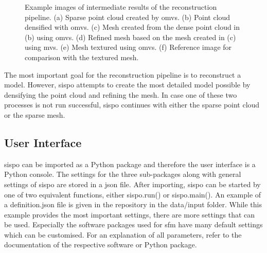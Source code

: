 \begin{figure}[htb]
\begin{subfigure}[b]{0.4\textwidth}
        \caption{}
        \label{fig:recon_step_img}
    \end{subfigure}
    \caption{Example images of intermediate results of the reconstruction pipeline. (a) Sparse point cloud created by \gls{omvs}. (b) Point cloud densified with \gls{omvs}. (c) Mesh created from the dense point cloud in (b) using \gls{omvs}. (d) Refined mesh based on the mesh created in (c) using \gls{mvs}. (e) Mesh textured using \gls{omvs}. (f) Reference image for comparison with the textured mesh.}
    \label{fig:recon_steps}
\end{figure}

The most important goal for the reconstruction pipeline is to reconstruct a model. However, \gls{sispo} attempts to create the most detailed model possible by densifying the point cloud and refining the mesh. In case one of these two processes is not run successful, \gls{sispo} continues with either the sparse point cloud or the sparse mesh.

\subsection{User Interface}
\Gls{sispo} can be imported as a Python package and therefore the user interface is a Python console. The settings for the three sub-packages along with general settings of \gls{sispo} are stored in a \gls{json} file. After importing, \gls{sispo} can be started by one of two equivalent functions, either sispo.run() or sispo.main(). An example of a definition.json file is given in the repository in the data/input folder. While this example provides the most important settings, there are more settings that can be used. Especially the software packages used for \gls{sfm} have many default settings which can be customised. For an explanation of all parameters, refer to the documentation of the respective software or Python package.

